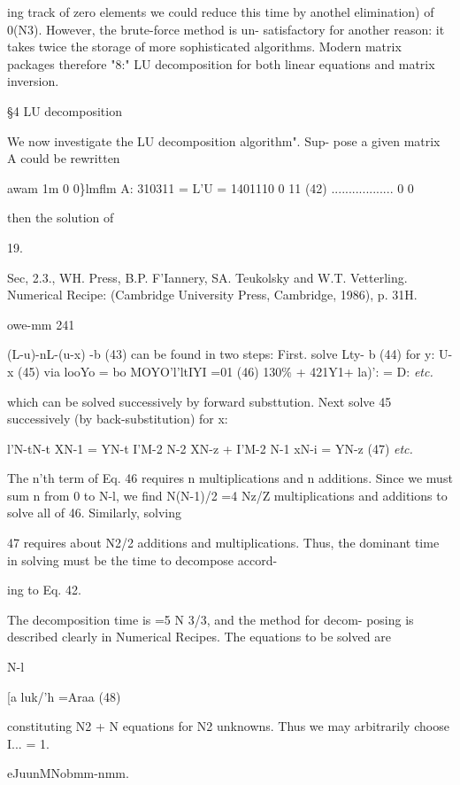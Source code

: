 ing track of zero elements we could reduce this time by anothel
elimination) of 0(N3). However, the brute-force method is un-
satisfactory for another reason: it takes twice the storage of more
sophisticated algorithms. Modern matrix packages therefore "8:"
LU decomposition for both linear equations and matrix inversion.

 

\S4 LU decomposition

We now investigate the LU decomposition algorithm". Sup-
pose a given matrix A could be rewritten

awam 1m 0 0\}lmflm
A: 310311 = L'U = 1401110 0  11 (42)
.................. 0 0

then the solution of

 

19.

Sec, 2.3., WH. Press, B.P. F'Iannery, SA. Teukolsky and W.T. Vetterling. Numerical Recipe:
(Cambridge University Press, Cambridge, 1986), p. 31H.

owe-mm 241

(L-u)-nL-(u-x) -b (43)
can be found in two steps: First. solve
Lty- b (44)
for
y: U-x (45)
via
looYo = bo
MOYO'l'ltIYI =01 (46)
130\% + 421Y1+ la)': = D:
\textit{etc.}

which can be solved successively by forward substtution. Next
solve 45 successively (by back-substitution) for x:

l'N-tN-t XN-1 = YN-t
I'M-2 N-2 XN-z + I'M-2 N-1 xN-i = YN-z (47)
\textit{etc.}

The n'th term of Eq. 46 requires n multiplications and n additions.
Since we must sum n from 0 to N-l, we find N(N-1)/2 =4 Nz/Z
multiplications and additions to solve all of 46. Similarly, solving

47 requires about N2/2 additions and multiplications. Thus, the
dominant time in solving must be the time to decompose accord-

ing to Eq. 42.

The decomposition time is =5 N 3/3, and the method for decom-
posing is described clearly in Numerical Recipes. The equations
to be solved are

N-l

[a luk/'h =Araa (48)

constituting N2 + N equations for N2 unknowns. Thus we may
arbitrarily choose I... = 1.

eJuunMNobmm-nmm.

